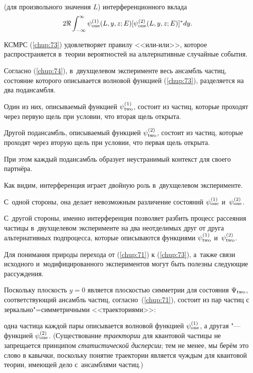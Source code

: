 (для произвольного значения $L$) интерференционного вклада $$2\Re\int_{-\infty}^\infty \psi_{\rm one}^{(1)}(L,y,z;E)

[\psi_{\rm one}^{(2)}(L,y,z;E)]^*dy.$$



КСМРС (\ref{chup:73}) удовлетворяет правилу <<или-или>>, которое распространяется в~теории вероятностей на альтернативные случайные события. 

Согласно (\ref{chup:74}), в~двухщелевом эксперименте весь ансамбль частиц, состояние которого описывается волновой функцией (\ref{chup:73}), разделяется на два подансамбля. 

Один из них, описываемый функцией $\psi_{\rm two}^{(1)}$, состоит из частиц, которые проходят через первую щель при условии, что вторая щель открыта. 

Другой подансамбль, описываемый функцией $\psi_{\rm two}^{(2)}$, состоит из частиц, которые проходят через вторую щель при условии, что первая щель открыта. 

При этом каждый подансамбль образует неустранимый контекст для своего партнёра.



Как видим, интерференция играет двойную роль в~двухщелевом эксперименте. 

С~одной стороны, она делает невозможным различение состояний $\psi_{\rm one}^{(1)}$ и~$\psi_{\rm one}^{(2)}$. 

С~другой стороны, именно интерференция позволяет разбить процесс рассеяния частицы в~двухщелевом эксперименте на два неотделимых друг от друга альтернативных подпроцесса, которые описываются функциями $\psi_{\rm two}^{(1)}$ и~$\psi_{\rm two}^{(2)}$.



Для понимания природы перехода от (\ref{chup:71}) к (\ref{chup:73}), а~также связи исходного и~модифицированного экспериментов могут быть полезны следующие рассуждения. 

Поскольку плоскость $y=0$ является плоскостью симметрии для состояния $\Psi_{\rm two}$, соответствующий ансамбль частиц, согласно~(\ref{chup:71}), состоит из пар частиц с зеркально"=симметричными <<траекториями>>: 

одна частица каждой пары описывается волновой функцией $\psi_{\rm one}^{(1)}$, а другая "--- функцией $\psi_{\rm one}^{(2)}$. (Существование {\it траектории} для квантовой частицы не запрещается принципом {\it статистической дисперсии}; тем не менее, мы берём это слово в кавычки, поскольку понятие траектории является чуждым для квантовой теории, имеющей дело с~ансамблями частиц.)



